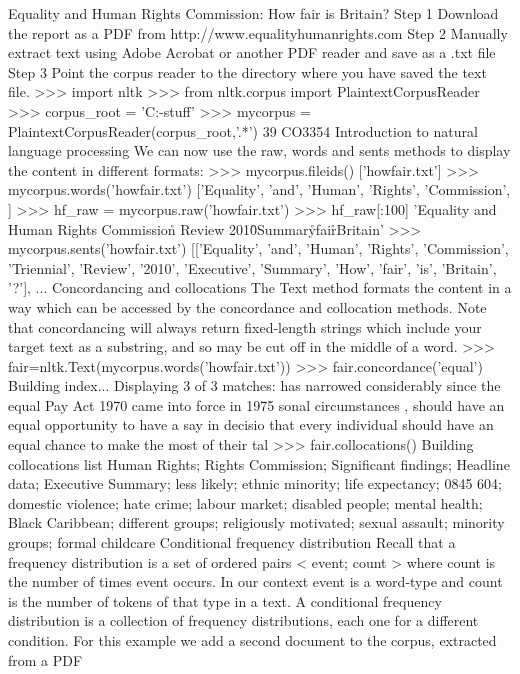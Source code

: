 Equality and Human Rights Commission: How fair is Britain?
Step 1 Download the report as a PDF from http://www.equalityhumanrights.com
Step 2 Manually extract text using Adobe Acrobat or another PDF reader and save
as a .txt file
Step 3 Point the corpus reader to the directory where you have saved the text file.
>>> import nltk
>>> from nltk.corpus import PlaintextCorpusReader
>>> corpus_root = 'C:\NLP-stuff\Corpora'
>>> mycorpus = PlaintextCorpusReader(corpus_root,'.*')
39
CO3354 Introduction to natural language processing
We can now use the raw, words and sents methods to display the content in
different formats:
>>> mycorpus.fileids()
['howfair.txt']
>>> mycorpus.words('howfair.txt')
['Equality', 'and', 'Human', 'Rights', 'Commission', ]
>>> hf_raw = mycorpus.raw('howfair.txt')
>>> hf_raw[:100]
'Equality and Human Rights Commission\r\nTriennial
Review 2010\r\nExecutive Summary\r\nHow fair\r\nis Britain'
>>> mycorpus.sents('howfair.txt')
[['Equality', 'and', 'Human', 'Rights', 'Commission', 'Triennial',
'Review', '2010', 'Executive', 'Summary', 'How', 'fair', 'is',
'Britain', '?'], ...
Concordancing and collocations
The Text method formats the content in a way which can be accessed by the
concordance and collocation methods. Note that concordancing will always
return fixed-length strings which include your target text as a substring, and so may
be cut off in the middle of a word.
>>> fair=nltk.Text(mycorpus.words('howfair.txt'))
>>> fair.concordance('equal')
Building index...
Displaying 3 of 3 matches:
has narrowed considerably since the equal Pay Act 1970 came into force in 1975
sonal circumstances , should have an equal opportunity to have a say in decisio
that every individual should have an equal chance to make the most of their tal
>>> fair.collocations()
Building collocations list
Human Rights; Rights Commission; Significant findings; Headline data;
Executive Summary; less likely; ethnic minority; life expectancy;
0845 604; domestic violence; hate crime; labour market; disabled people;
mental health; Black Caribbean; different groups; religiously motivated;
sexual assault; minority groups; formal childcare
Conditional frequency distribution
Recall that a frequency distribution is a set of ordered pairs < event; count >
where count is the number of times event occurs. In our context event is a word-type
and count is the number of tokens of that type in a text. A conditional frequency
distribution is a collection of frequency distributions, each one for a different
condition.
For this example we add a second document to the corpus, extracted from a PDF
